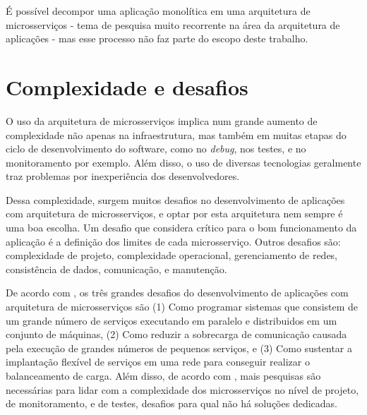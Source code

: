 É possível decompor uma aplicação monolítica em uma arquitetura de microsserviços - tema de pesquisa muito recorrente na área da arquitetura de aplicações - mas esse processo não faz parte do escopo deste trabalho.


\section{Complexidade e desafios}

O uso da arquitetura de microsserviços implica num grande aumento de complexidade não apenas na infraestrutura, mas também em muitas etapas do ciclo de desenvolvimento do software, como no \emph{debug}, nos testes, e no monitoramento por exemplo. Além disso, o uso de diversas tecnologias geralmente traz problemas por inexperiência dos desenvolvedores.

Dessa complexidade, surgem muitos desafios no desenvolvimento de aplicações com arquitetura de microsserviços, e optar por esta arquitetura nem sempre é uma boa escolha. Um desafio que  considera crítico para o bom funcionamento da aplicação é a definição dos limites de cada microsserviço. Outros desafios são: complexidade de projeto, complexidade operacional, gerenciamento de redes, consistência de dados, comunicação, e manutenção. \cite{top10-microservices-challenges}

De acordo com , os três grandes desafios do desenvolvimento de aplicações com arquitetura de microsserviços são (1) Como programar sistemas que consistem de um grande número de serviços executando em paralelo e distribuidos em um conjunto de máquinas, (2) Como reduzir a sobrecarga de comunicação causada pela execução de grandes números de pequenos serviços, e (3) Como sustentar a implantação flexível de serviços em uma rede para conseguir realizar o balanceamento de carga. Além disso, de acordo com , mais pesquisas são necessárias para lidar com a complexidade dos microsserviços no nível de projeto, de monitoramento, e de testes, desafios para qual não há soluções dedicadas.


